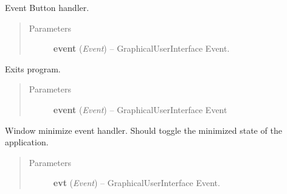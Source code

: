 \documentclass[letterpaper,10pt,english]{sphinxmanual}
\begin{document}
\begin{fulllineitems}

\begin{fulllineitems}
\label{diwacs:diwacs.GraphicalUserInterface.OnEvtBtn}
Event Button handler.
\begin{quote}\begin{description}
\item[{Parameters}] \leavevmode
\textbf{event} (\emph{Event}) -- GraphicalUserInterface Event.

\end{description}\end{quote}

\end{fulllineitems}


\begin{fulllineitems}
\label{diwacs:diwacs.GraphicalUserInterface.OnExit}
Exits program.
\begin{quote}\begin{description}
\item[{Parameters}] \leavevmode
\textbf{event} (\emph{Event}) -- GraphicalUserInterface Event

\end{description}\end{quote}

\end{fulllineitems}


\begin{fulllineitems}
\label{diwacs:diwacs.GraphicalUserInterface.OnIconify}
Window minimize event handler.
Should toggle the minimized state of the application.
\begin{quote}\begin{description}
\item[{Parameters}] \leavevmode
\textbf{evt} (\emph{Event}) -- GraphicalUserInterface Event.

\end{description}\end{quote}

\end{fulllineitems}



\end{fulllineitems}
\end{document}
